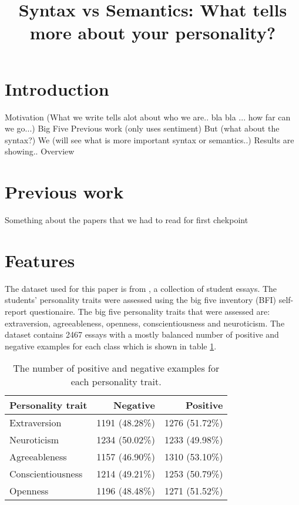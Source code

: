 \documentclass[10pt, a4paper]{article}
\title{Syntax vs Semantics: What tells more about your personality?}
\begin{document}
\maketitleabstract

\section{Introduction}
Motivation (What we write tells alot about who we are.. bla bla ... how far can we go...)
Big Five
Previous work (only uses sentiment)
But (what about the syntax?)
We (will see what is more important syntax or semantics..)
Results are showing..
Overview

\section{Previous work}
Something about the papers that we had to read for first chekpoint

\section{Features}

The dataset used for this paper is from \cite{pennebaker}, a collection of student essays.
The students' personality traits were assessed using the big five inventory (BFI) self-report questionaire.
The big five personality traits that were assessed are: extraversion, agreeableness, openness, conscientiousness and neuroticism.
The dataset contains 2467  essays with a mostly balanced number of positive and negative examples for each class which is shown in table \ref{positive negative examples}.

\begin{table}[H]
	\begin{tabular}{lrr}
		\hline
		Personality trait & Negative & Positive \\ \hline
		Extraversion                                  & 1191 (48.28\%)                         & 1276 (51.72\%)                         \\
		Neuroticism                                  & 1234 (50.02\%)                         & 1233 (49.98\%)                         \\
		Agreeableness                                  & 1157 (46.90\%)                         & 1310 (53.10\%)                         \\
		Conscientiousness                                  & 1214 (49.21\%)                         & 1253 (50.79\%)                         \\
		Openness                                  & 1196 (48.48\%)                         & 1271 (51.52\%)                         \\ \hline
	\end{tabular}
	\caption{The number of positive and negative examples for each personality trait.}
	\label{positive negative examples}
\end{table}
\end{document}
